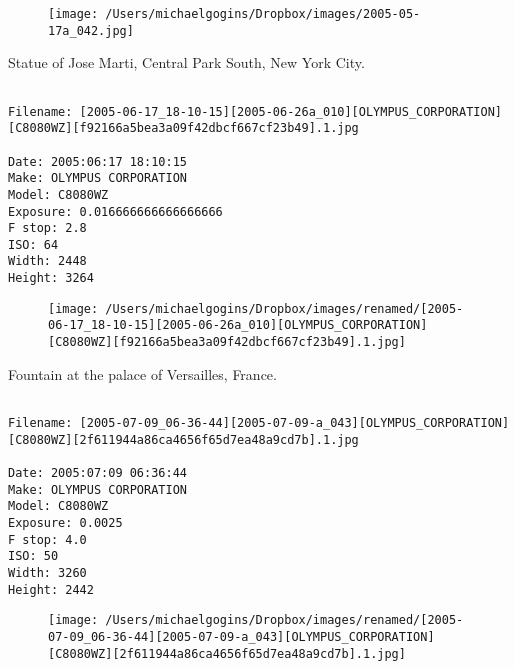 \begin{figure}
\texttt{[image: /Users/michaelgogins/Dropbox/images/2005-05-17a\_042.jpg]}
\end{figure}
    
\clearpage
\onecolumn
\noindent Statue of Jose Marti, Central Park South, New York City.
\noindent
\begin{lstlisting}

Filename: [2005-06-17_18-10-15][2005-06-26a_010][OLYMPUS_CORPORATION][C8080WZ][f92166a5bea3a09f42dbcf667cf23b49].1.jpg

Date: 2005:06:17 18:10:15
Make: OLYMPUS CORPORATION
Model: C8080WZ
Exposure: 0.016666666666666666
F stop: 2.8
ISO: 64
Width: 2448
Height: 3264
\end{lstlisting}
\clearpage

\begin{figure}
\texttt{[image: /Users/michaelgogins/Dropbox/images/renamed/[2005-06-17\_18-10-15][2005-06-26a\_010][OLYMPUS\_CORPORATION][C8080WZ][f92166a5bea3a09f42dbcf667cf23b49].1.jpg]}
\end{figure}
    
\clearpage
\onecolumn
\noindent Fountain at the palace of Versailles, France.
\noindent
\begin{lstlisting}

Filename: [2005-07-09_06-36-44][2005-07-09-a_043][OLYMPUS_CORPORATION][C8080WZ][2f611944a86ca4656f65d7ea48a9cd7b].1.jpg

Date: 2005:07:09 06:36:44
Make: OLYMPUS CORPORATION
Model: C8080WZ
Exposure: 0.0025
F stop: 4.0
ISO: 50
Width: 3260
Height: 2442
\end{lstlisting}
\clearpage

\begin{figure}
\texttt{[image: /Users/michaelgogins/Dropbox/images/renamed/[2005-07-09\_06-36-44][2005-07-09-a\_043][OLYMPUS\_CORPORATION][C8080WZ][2f611944a86ca4656f65d7ea48a9cd7b].1.jpg]}
\end{figure}
    
